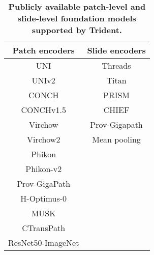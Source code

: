 \begin{table}[t]
    \centering
    \caption{\textbf{Publicly available patch-level and slide-level foundation models supported by Trident.}
    }
    \begin{tabular}{cc}
    \toprule
    \textbf{Patch encoders} & \textbf{Slide encoders} \\
    \midrule
    UNI \cite{chen2024towards}                   & Threads \cite{vaidya2024amolecular}                \\
    UNIv2 \cite{chen2024towards}                   & Titan \cite{ding2024titan}                 \\
    CONCH \cite{luVisuallanguageFoundationModel2024}                  &  PRISM \cite{shaikovski2024prism}                \\
    CONCHv1.5 \cite{luVisuallanguageFoundationModel2024}              &  CHIEF \cite{wang2024chief}                 \\
    Virchow \cite{vorontsov2024foundation}                &  Prov-Gigapath \cite{xu2024whole}                 \\
    Virchow2 \cite{zimmermannVirchow2ScalingSelfSupervised2024}              &  Mean pooling         \\
    Phikon \cite{filiotScalingSelfSupervisedLearning2023}                 &                        \\
    Phikon-v2 \cite{filiotPhikonv2LargePublic2024}              &                        \\
    Prov-GigaPath \cite{xu2024whole}          &                        \\
    H-Optimus-0 \cite{saillardHOptimus02024}           &                        \\
    MUSK \cite{xiangVisionLanguageFoundation2025}                   &                        \\
    CTransPath \cite{wangTransformerbasedUnsupervisedContrastive2022}             &                        \\
    ResNet50-ImageNet \cite{heDeepResidualLearning2015}      &                        \\
    \bottomrule
    \end{tabular}
    \label{tab:foundation_models}
\end{table}

